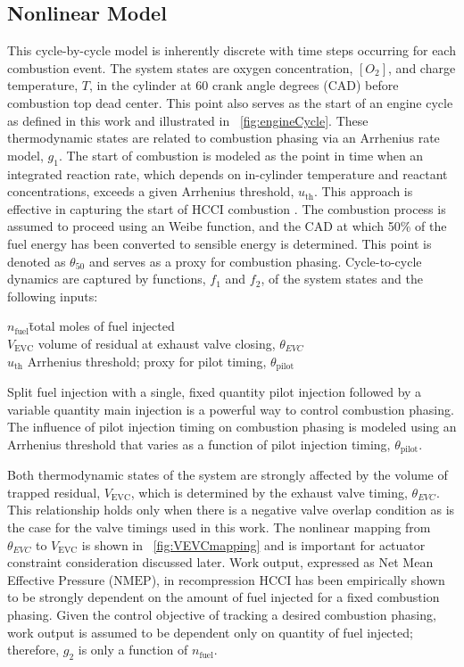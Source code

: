 \subsection{Nonlinear Model}
\label{sec:nonlinearModel}
This cycle-by-cycle model is inherently discrete with time steps occurring for each combustion event. The system states are oxygen concentration, $[O_2]$, and charge temperature, $T$, in the cylinder at 60 crank angle degrees (CAD) before combustion top dead center. This point also serves as the start of an engine cycle as defined in this work and illustrated in  \figurename~\ref{fig:engineCycle}. These thermodynamic states are related to combustion phasing via an Arrhenius rate model, $g_1$. The start of combustion is modeled as the point in time when an integrated reaction rate, which depends on in-cylinder temperature and reactant concentrations, exceeds a given Arrhenius threshold, $u_{\mathrm{th}}$. This approach is effective in capturing the start of HCCI combustion \cite{Shaver2005}. The combustion process is assumed to proceed using an Weibe function, and the CAD at which 50\% of the fuel energy has been converted to sensible energy is determined. This point is denoted as $\theta_{50}$ and serves as a proxy for combustion phasing.
Cycle-to-cycle dynamics are captured by functions, $f_1$ and $f_2$, of the system states and the following inputs:
\begin{tabbing}
$n_{\mathrm{fuel}}$\quad\= total moles of fuel injected\\
$V_{\mathrm{EVC}}$\> volume of residual at exhaust valve closing, $\theta_{EVC}$\\
$u_{\mathrm{th}}$\> Arrhenius threshold; proxy for pilot timing, $\theta_{\mathrm{pilot}}$
\end{tabbing}

Split fuel injection with a single, fixed quantity pilot injection followed by a variable quantity main injection is a powerful way to control combustion phasing. The influence of pilot injection timing on combustion phasing is modeled using an Arrhenius threshold that varies as a function of pilot injection timing, $\theta_{\mathrm{pilot}}$.

Both thermodynamic states of the system are strongly affected by the volume of trapped residual, $V_{\mathrm{EVC}}$, which is determined by the exhaust valve timing, $\theta_{EVC}$. This relationship holds only when there is a negative valve overlap condition as is the case for the valve timings used in this work. The nonlinear mapping from $\theta_{EVC}$ to $V_{\mathrm{EVC}}$ is shown in \figurename~\ref{fig:VEVCmapping} and is important for actuator constraint consideration discussed later. Work output, expressed as Net Mean Effective Pressure ($\mathrm{NMEP}$), in recompression HCCI has been empirically shown to be strongly dependent on the amount of fuel injected for a fixed combustion phasing. Given the control objective of tracking a desired combustion phasing, work output is assumed to be dependent only on quantity of fuel injected; therefore, $g_2$ is only a function of $n_{\mathrm{fuel}}$.

